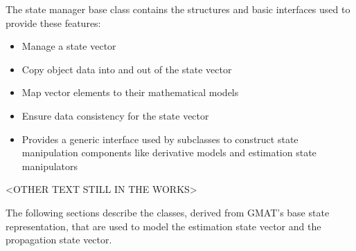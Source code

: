 The state manager base class contains the structures and basic interfaces used to provide these
features:

\begin{itemize}
\item Manage a state vector
\item Copy object data into and out of the state vector
\item Map vector elements to their mathematical models
\item Ensure data consistency for the state vector
\item Provides a generic interface used by subclasses to construct state manipulation components
like derivative models and estimation state manipulators
\end{itemize}




<OTHER TEXT STILL IN THE WORKS>

The following sections describe the classes, derived from GMAT's base state representation, that
are used to model the estimation state vector and the propagation state vector.